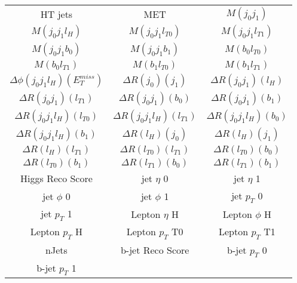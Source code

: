  \begin{center}
  \begin{tabular}{ccc}
    \hline\hline
    HT jets & MET & $M(j_0j_1)$ \\
    $M(j_0j_1l_{H})$ & $M(j_0j_1l_{T0})$ & $M(j_0j_1l_{T1})$ \\
    $M(j_0j_1b_0)$ & $M(j_0j_1b_1)$ & $M(b_0l_{T0})$ \\
    $M(b_0l_{T1})$ & $M(b_1l_{T0})$ & $M(b_1l_{T1})$ \\
    $\Delta\phi(j_0j_1l_{H})(E_T^{miss})$ & $\Delta R(j_0)(j_1)$ & $\Delta R(j_0j_1)(l_{H})$ \\
    $\Delta R(j_0j_1)(l_{T1})$ & $\Delta R(j_0j_1)(b_0)$ & $\Delta R(j_0j_1)(b_1)$ \\
    $\Delta R(j_0j_1l_{H})(l_{T0})$ & $\Delta R(j_0j_1l_{H})(l_{T1})$ & $\Delta R(j_0j_1l_{H})(b_0)$ \\
    $\Delta R(j_0j_1l_{H})(b_1)$ & $\Delta R(l_{H})(j_0)$ & $\Delta R(l_{H})(j_1)$ \\
    $\Delta R(l_{H})(l_{T1})$ & $\Delta R(l_{T0})(l_{T1})$ & $\Delta R(l_{T0})(b_0)$ \\
    $\Delta R(l_{T0})(b_1)$ & $\Delta R(l_{T1})(b_0)$ & $\Delta R(l_{T1})(b_1)$ \\
    Higgs Reco Score & jet  $\eta$ 0 & jet  $\eta$ 1 \\
    jet $\phi$ 0 & jet $\phi$ 1 & jet  $p_T$ 0 \\
    jet  $p_T$ 1 & Lepton  $\eta$ H & Lepton $\phi$ H \\
    Lepton  $p_T$ H & Lepton  $p_T$ T0 & Lepton  $p_T$ T1 \\
    nJets & b-jet Reco Score & b-jet $p_T$ 0 \\
    b-jet $p_T$ 1 & & \\
    \hline
  \end{tabular}
  \end{center}

